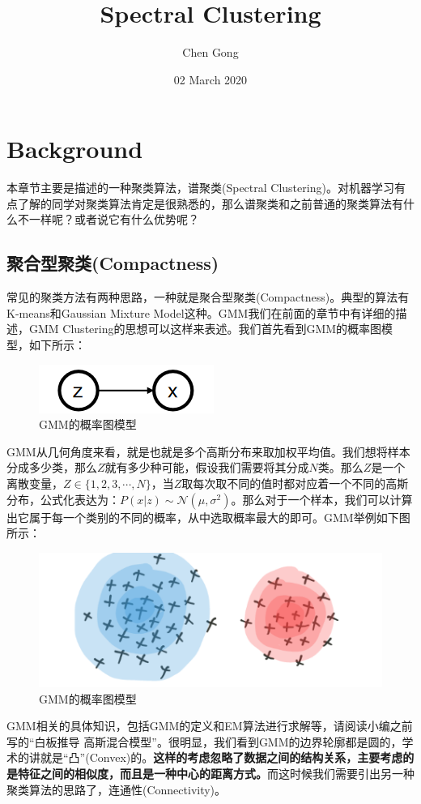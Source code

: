 \documentclass[a4paper]{article}
\title{Spectral Clustering}
\author{Chen Gong}
\date{02 March 2020}
\begin{document}
\maketitle
\tableofcontents
\newpage
\setcounter{page}{1} %
\clearpage

\section{Background}
本章节主要是描述的一种聚类算法，谱聚类(Spectral Clustering)。对机器学习有点了解的同学对聚类算法肯定是很熟悉的，那么谱聚类和之前普通的聚类算法有什么不一样呢？或者说它有什么优势呢？

\subsection{聚合型聚类(Compactness)}
常见的聚类方法有两种思路，一种就是聚合型聚类(Compactness)。典型的算法有K-means和Gaussian Mixture Model这种。GMM我们在前面的章节中有详细的描述，GMM Clustering的思想可以这样来表述。我们首先看到GMM的概率图模型，如下所示：
\begin{figure}[H]
    \centering
    \includegraphics[width=.25\textwidth]{微信图片_20200302213857.png}
    \caption{GMM的概率图模型}
    \label{fig:my_label_1}
\end{figure}
GMM从几何角度来看，就是也就是多个高斯分布来取加权平均值。我们想将样本分成多少类，那么$Z$就有多少种可能，假设我们需要将其分成$N$类。那么$Z$是一个离散变量，$Z\in \{1,2,3,\cdots,N\}$，当$Z$取每次取不同的值时都对应着一个不同的高斯分布，公式化表达为：$P(x|z)\sim \mathcal{N}(\mu,\sigma^2)$。那么对于一个样本，我们可以计算出它属于每一个类别的不同的概率，从中选取概率最大的即可。GMM举例如下图所示：
\begin{figure}[H]
    \centering
    \includegraphics[width=.45\textwidth]{微信图片_20200302215950.png}
    \caption{GMM的概率图模型}
    \label{fig:my_label_1}
\end{figure}
GMM相关的具体知识，包括GMM的定义和EM算法进行求解等，请阅读小编之前写的“白板推导 高斯混合模型”。很明显，我们看到GMM的边界轮廓都是圆的，学术的讲就是“凸”(Convex)的。\textbf{这样的考虑忽略了数据之间的结构关系，主要考虑的是特征之间的相似度，而且是一种中心的距离方式。}而这时候我们需要引出另一种聚类算法的思路了，连通性(Connectivity)。
\end{document}
